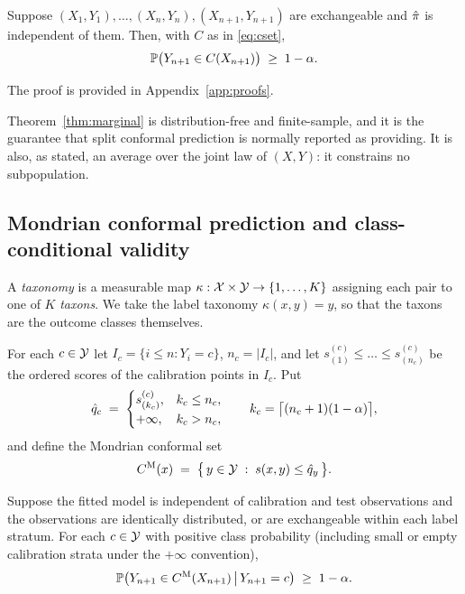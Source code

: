 \begin{theorem}\label{thm:marginal}
Suppose $(X_1,Y_1), \dots, (X_n, Y_n), (X_{n+1}, Y_{n+1})$ are exchangeable and
$\hat{\pi}$ is independent of them. Then, with $C$ as in \eqref{eq:cset},
\begin{equation}
\mathbb{P}\big( Y_{n+1} \in C(X_{n+1}) \big) \;\ge\; 1-\alpha .
\end{equation}
\end{theorem}

\noindent The proof is provided in Appendix~\ref{app:proofs}.

Theorem~\ref{thm:marginal} is distribution-free and finite-sample, and it is the
guarantee that split conformal prediction is normally reported as providing. It
is also, as stated, an average over the joint law of $(X,Y)$: it constrains no
subpopulation.

\subsection{Mondrian conformal prediction and class-conditional validity}

\begin{definition}
A \emph{taxonomy} is a measurable map
$\kappa : \mathcal{X} \times \mathcal{Y} \to \{1, \dots, K\}$ assigning each pair to
one of $K$ \emph{taxons}. We take the label taxonomy $\kappa(x,y) = y$, so that
the taxons are the outcome classes themselves.
\end{definition}

For each $c \in \mathcal{Y}$ let $I_c = \{ i \le n : Y_i = c \}$, $n_c = |I_c|$, and
let $s^{(c)}_{(1)} \le \dots \le s^{(c)}_{(n_c)}$ be the ordered scores of the
calibration points in $I_c$. Put
\begin{equation}
\hat{q}_c \;=\; \begin{cases}s^{(c)}_{(k_c)},&k_c\le n_c,\\+\infty,&k_c>n_c,\end{cases}\qquad
k_c=\big\lceil(n_c+1)(1-\alpha)\big\rceil,
\label{eq:qhatc}
\end{equation}
and define the Mondrian conformal set
\begin{equation}
C^{\mathrm{M}}(x) \;=\; \big\{\, y \in \mathcal{Y} \;:\; s(x,y) \le \hat{q}_y \,\big\} .
\label{eq:mset}
\end{equation}

\begin{theorem}\label{thm:conditional}
Suppose the fitted model is independent of calibration and test observations
and the observations are identically distributed, or are exchangeable
within each label stratum. For each $c\in\mathcal{Y}$ with positive class
probability (including small or empty calibration strata under the
$+\infty$ convention),
\begin{equation}
\mathbb{P}\big( Y_{n+1} \in C^{\mathrm{M}}(X_{n+1}) \,\big|\, Y_{n+1} = c \big)
\;\ge\; 1-\alpha .
\end{equation}
\end{theorem}

